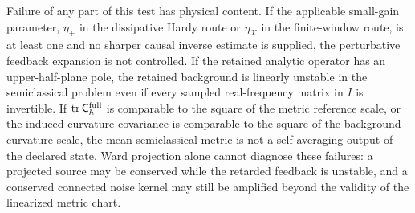 \begin{controlledapproximation}
Failure of any part of this test has physical content.  If the applicable
small-gain parameter, \(\eta_+\) in the dissipative Hardy route or
\(\eta_{\mathcal X}\) in the finite-window route, is at least one and no
sharper causal inverse estimate is supplied, the perturbative feedback
expansion is not controlled.  If the retained analytic operator has an
upper-half-plane pole, the retained background is linearly unstable in the
semiclassical problem even if every sampled real-frequency matrix in \(I\) is
invertible.  If
\(\operatorname{tr}\mathsf C_h^{\rm full}\) is comparable to the square of
the metric reference scale, or the induced curvature covariance is comparable
to the square of the background curvature scale, the mean semiclassical
metric is not a self-averaging output of the declared state.  Ward projection
alone cannot diagnose these failures: a projected source may be conserved
while the retarded feedback is unstable, and a conserved connected noise
kernel may still be amplified beyond the validity of the linearized metric
chart.
\end{controlledapproximation}


